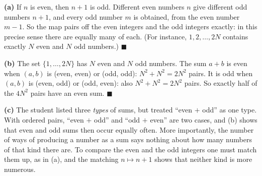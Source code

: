 \textbf{(a)} If $n$ is even, then $n+1$ is odd. Different even numbers $n$ give different odd numbers $n+1$, and every odd number $m$ is obtained, from the even number $m-1$. So the map pairs off the even integers and the odd integers exactly: in this precise sense there are equally many of each. (For instance, $1,2,\dots,2N$ contains exactly $N$ even and $N$ odd numbers.) $\blacksquare$

\textbf{(b)} The set $\{1,\dots,2N\}$ has $N$ even and $N$ odd numbers. The sum $a+b$ is even when $(a,b)$ is (even, even) or (odd, odd): $N^2+N^2=2N^2$ pairs. It is odd when $(a,b)$ is (even, odd) or (odd, even): also $N^2+N^2=2N^2$ pairs. So exactly half of the $4N^2$ pairs have an even sum. $\blacksquare$

\textbf{(c)} The student listed three \emph{types} of sums, but treated ``even $+$ odd'' as one type. With ordered pairs, ``even $+$ odd'' and ``odd $+$ even'' are two cases, and (b) shows that even and odd sums then occur equally often. More importantly, the number of ways of producing a number as a sum says nothing about how many numbers of that kind there are. To compare the even and the odd integers one must match them up, as in (a), and the matching $n\mapsto n+1$ shows that neither kind is more numerous.
